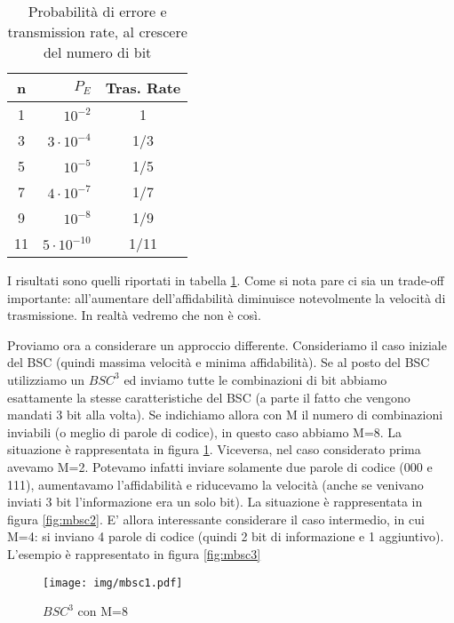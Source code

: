 \begin{table}[htbp]
  \begin{center}
   \begin{tabular}{c | r | c}
        n & $P_E$ & Tras. Rate \\
        \hline
	1 & $10^{-2}$ & 1 \\
        3 & $3 \cdot 10^{-4}$ & 1/3 \\
        5 & $10^{-5}$ & 1/5 \\
        7 & $4 \cdot 10^{-7}$ & 1/7 \\
        9 & $10^{-8}$ & 1/9 \\
       11 & $5 \cdot 10^{-10}$ & 1/11 \\
    \end{tabular}
  \end{center}
\caption{Probabilità di errore e transmission rate, al crescere del numero di bit}
\label{tab:bscc}
\end{table}

I risultati sono quelli riportati in tabella \ref{tab:bscc}. Come si nota pare ci sia un trade-off importante: all'aumentare dell'affidabilità diminuisce notevolmente la velocità di trasmissione.
In realtà vedremo che non è così.

Proviamo ora a considerare un approccio differente. Consideriamo il caso iniziale del BSC (quindi massima velocità e minima affidabilità). Se al posto del BSC utilizziamo un $BSC^3$ ed inviamo tutte le combinazioni di bit abbiamo esattamente la stesse caratteristiche del BSC (a parte il fatto che vengono mandati 3 bit alla volta). Se indichiamo allora con M il numero di combinazioni 
inviabili (o meglio di parole di codice), in questo caso abbiamo M=8.
La situazione è rappresentata in figura \ref{fig:mbsc1}.
Viceversa, nel caso considerato prima avevamo M=2. Potevamo infatti inviare solamente due parole di codice (000 e 111), aumentavamo 
l'affidabilità e riducevamo la velocità (anche se venivano inviati 3 bit l'informazione era un solo bit). 
La situazione è rappresentata in figura \ref{fig:mbsc2}.
E' allora interessante considerare il caso intermedio, in cui M=4: si inviano 4 parole di codice (quindi 2 bit di informazione e 1 aggiuntivo).
L'esempio è rappresentato in figura \ref{fig:mbsc3}


\begin{figure}[htbp]
\begin{center}
	\texttt{[image: img/mbsc1.pdf]}
\caption{$BSC^3$ con M=8}
\label{fig:mbsc1}
\end{center}
\end{figure}

